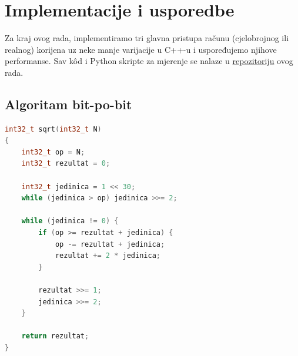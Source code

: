 \documentclass[12pt]{scrartcl}
\begin{document}
\section{Implementacije i usporedbe}
Za kraj ovog rada, implementiramo tri glavna pristupa računu (cjelobrojnog ili realnog) korijena uz neke manje varijacije
u C++-u i uspoređujemo njihove performanse. Sav k\^od i Python skripte za mjerenje se nalaze u
\href{https://github.com/mraguzin/mathsoft-esej2}{repozitoriju} ovog rada.

\subsection{Algoritam bit-po-bit}
\begin{lstlisting}[language=C++, caption=C++ implementacija bit-po-bit algoritma]
int32_t sqrt(int32_t N)
{
	int32_t op = N;
	int32_t rezultat = 0;

	int32_t jedinica = 1 << 30;
	while (jedinica > op) jedinica >>= 2;

	while (jedinica != 0) {
		if (op >= rezultat + jedinica) {
			op -= rezultat + jedinica;
			rezultat += 2 * jedinica;
		}

		rezultat >>= 1;
		jedinica >>= 2;
	}

	return rezultat;
}
\end{lstlisting}
\end{document}
